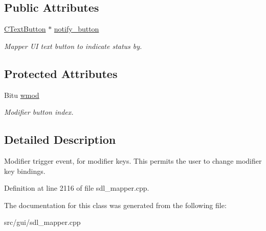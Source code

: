 \subsection*{Public Attributes}
\begin{DoxyCompactItemize}
\item 
\hypertarget{classCModEvent_aa5dc746da9ec638e1959bfd1dddafc75}{\hyperlink{classCTextButton}{C\-Text\-Button} $\ast$ \hyperlink{classCModEvent_aa5dc746da9ec638e1959bfd1dddafc75}{notify\-\_\-button}}\label{classCModEvent_aa5dc746da9ec638e1959bfd1dddafc75}

\begin{DoxyCompactList}\small\item\em Mapper U\-I text button to indicate status by. \end{DoxyCompactList}\end{DoxyCompactItemize}
\subsection*{Protected Attributes}
\begin{DoxyCompactItemize}
\item 
\hypertarget{classCModEvent_a54a25228b8da694c33c44e4b161defd9}{Bitu \hyperlink{classCModEvent_a54a25228b8da694c33c44e4b161defd9}{wmod}}\label{classCModEvent_a54a25228b8da694c33c44e4b161defd9}

\begin{DoxyCompactList}\small\item\em Modifier button index. \end{DoxyCompactList}\end{DoxyCompactItemize}


\subsection{Detailed Description}
Modifier trigger event, for modifier keys. This permits the user to change modifier key bindings. 

Definition at line 2116 of file sdl\-\_\-mapper.\-cpp.



The documentation for this class was generated from the following file\-:\begin{DoxyCompactItemize}
\item 
src/gui/sdl\-\_\-mapper.\-cpp\end{DoxyCompactItemize}
